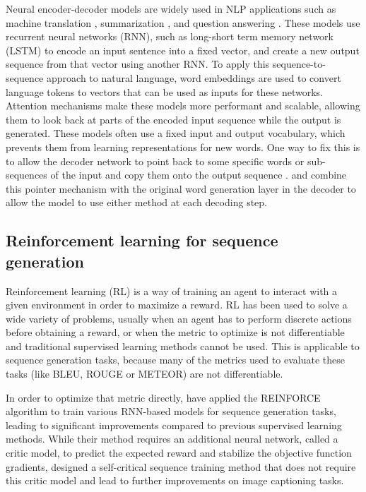 Neural encoder-decoder models are widely used in NLP applications such as machine translation \citep{sutskever2014}, summarization \citep{chopra2016,nallapati2016}, and question answering \citep{hermann2015}. These models use recurrent neural networks (RNN), such as long-short term memory network (LSTM) \citep{hochreiter1997} to encode an input sentence into a fixed vector, and create a new output sequence from that vector using another RNN. To apply this sequence-to-sequence approach to natural language, word embeddings \citep{mikolov2013,pennington2014} are used to convert language tokens to vectors that can be used as inputs for these networks. Attention mechanisms \citep{bahdanau2014} make these models more performant and scalable, allowing them to look back at parts of the encoded input sequence while the output is generated. These models often use a fixed input and output vocabulary, which prevents them from learning representations for new words. One way to fix this is to allow the decoder network to point back to some specific words or sub-sequences of the input and copy them onto the output sequence \citep{vinyals2015}. \citet{gulcehre2016} and \citet{merity2016} combine this pointer mechanism with the original word generation layer in the decoder to allow the model to use either method at each decoding step.

\subsection{Reinforcement learning for sequence generation}

Reinforcement learning (RL) is a way of training an agent to interact with a given environment in order to maximize a reward. RL has been used to solve a wide variety of problems, usually when an agent has to perform discrete actions before obtaining a reward, or when the metric to optimize is not differentiable and traditional supervised learning methods cannot be used. This is applicable to sequence generation tasks, because many of the metrics used to evaluate these tasks (like BLEU, ROUGE or METEOR) are not differentiable.

In order to optimize that metric directly, \citet{ranzato2015} have applied the REINFORCE algorithm \citep{williams1992} to train various RNN-based models for sequence generation tasks, leading to significant improvements compared to previous supervised learning methods. While their method requires an additional neural network, called a critic model, to predict the expected reward and stabilize the objective function gradients, \citet{rennie2016} designed a self-critical sequence training method that does not require this critic model and lead to further improvements on image captioning tasks.

